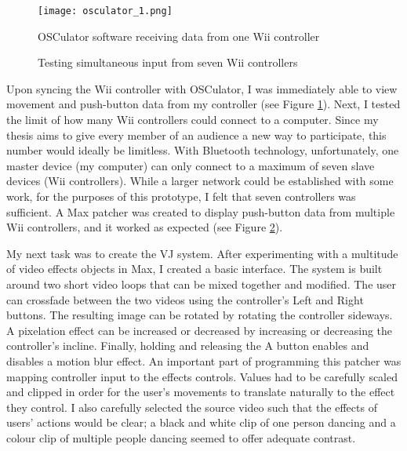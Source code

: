 \begin{figure}
	\centering

	\texttt{[image: osculator\_1.png]}
	\caption{OSCulator software receiving data from one Wii controller}

	\label{prototyping1.1}
\end{figure}

\begin{figure}
	\centering

	\hspace{0.1cm}
	\caption{Testing simultaneous input from seven Wii controllers}

	\label{prototyping1.2}
\end{figure}

Upon syncing the Wii controller with OSCulator, I was immediately able to view movement and push-button data from my controller (see Figure \ref{prototyping1.1}). Next, I tested the limit of how many Wii controllers could connect to a computer. Since my thesis aims to give every member of an audience a new way to participate, this number would ideally be limitless. With Bluetooth technology, unfortunately, one master device (my computer) can only connect to a maximum of seven slave devices (Wii controllers). While a larger network could be established with some work, for the purposes of this prototype, I felt that seven controllers was sufficient. A Max patcher was created to display push-button data from multiple Wii controllers, and it worked as expected (see Figure \ref{prototyping1.2}).

My next task was to create the VJ system. After experimenting with a multitude of video effects objects in Max, I created a basic interface. The system is built around two short video loops that can be mixed together and modified. The user can crossfade between the two videos using the controller's Left and Right buttons. The resulting image can be rotated by rotating the controller sideways. A pixelation effect can be increased or decreased by increasing or decreasing the controller's incline. Finally, holding and releasing the A button enables and disables a motion blur effect. An important part of programming this patcher was mapping controller input to the effects controls. Values had to be carefully scaled and clipped in order for the user's movements to translate naturally to the effect they control. I also carefully selected the source video such that the effects of users' actions would be clear; a black and white clip of one person dancing and a colour clip of multiple people dancing seemed to offer adequate contrast.

